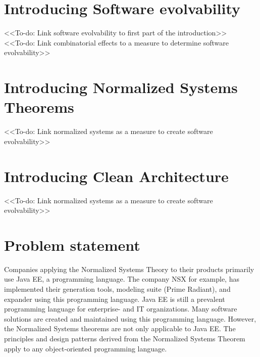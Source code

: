 \section{Introducing Software evolvability}
<<To-do: Link software evolvability to first part of the introduction>>\\
<<To-do: Link combinatorial effects to a measure to determine software evolvability>>

\section{Introducing Normalized Systems Theorems}
<<To-do: Link normalized systems as a measure to create software evolvability>>

\section{Introducing Clean Architecture}
<<To-do: Link normalized systems as a measure to create software evolvability>>

\section{Problem statement} \label{problem_statement}

Companies applying the Normalized Systems Theory to their products primarily use Java EE,
a programming language. The company NSX
 for example, has implemented their
generation tools, modeling suite (Prime Radiant), and expander using this programming
language. Java EE is still a prevalent programming language for enterprise- and IT
organizations. Many software solutions are created and maintained using this programming
language. However, the Normalized Systems theorems are not only applicable to Java EE. The
principles and design patterns derived from the Normalized Systems Theorem apply to any
object-oriented programming language. 

